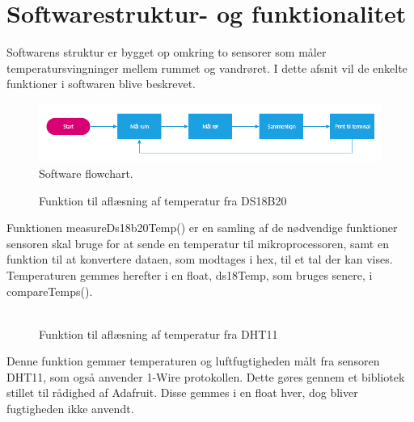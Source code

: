 \section{Softwarestruktur- og funktionalitet}
Softwarens struktur er bygget op omkring to sensorer som måler temperatursvingninger mellem rummet og vandrøret. I dette afsnit vil de enkelte funktioner i softwaren blive beskrevet. 
\begin{figure}[h!]
  \centering
  \includegraphics[width=1\textwidth]{figures/Fase1software.png}
  \caption{Software flowchart.}
  \label{fase1flow}
\end{figure}

\begin{figure}[h!]
  \centering
  \caption{Funktion til aflæsning af temperatur fra DS18B20}
  \label{ds18b20Measure}
\end{figure}
Funktionen measureDs18b20Temp() er en samling af de nødvendige funktioner sensoren skal bruge for at sende en temperatur til mikroprocessoren, samt en funktion til at konvertere dataen, som modtages i hex, til et tal der kan vises.\newline
Temperaturen gemmes herefter i en float, ds18Temp, som bruges senere, i compareTemps().\\\\

\begin{figure}[h!]
  \centering
  \caption{Funktion til aflæsning af temperatur fra DHT11}
  \label{dht11Measure}
\end{figure}
Denne funktion gemmer temperaturen og luftfugtigheden målt fra sensoren DHT11, som også anvender 1-Wire protokollen. Dette gøres gennem et bibliotek stillet til rådighed af Adafruit.\newline
Disse gemmes i en float hver, dog bliver fugtigheden ikke anvendt.

